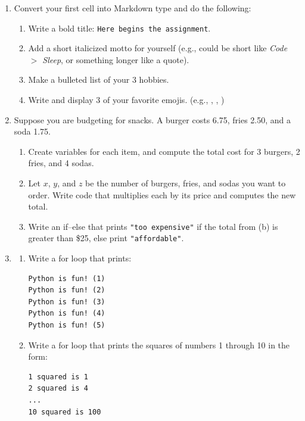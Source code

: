 \documentclass[12pt]{article}
\begin{document}
\begin{enumerate}[leftmargin=1.2em, label=\textbf{\arabic*.}]

  \item
  Convert your first cell into Markdown type and do the following:
  \begin{enumerate}
    \item Write a bold title: \texttt{Here begins the assignment}. \vspace{1.5cm}
    \item Add a short italicized motto for yourself (e.g., could be short like \textit{Code $>$ Sleep}, or something longer like a quote). \vspace{1.5cm}
    \item Make a bulleted list of your 3 hobbies. \vspace{2cm}
    \item Write and display 3 of your favorite emojis. (e.g., , , )\vspace{1.5cm}
  \end{enumerate}

\item Suppose you are budgeting for snacks. A burger costs 6.75, fries 2.50, and a soda 1.75. 
\begin{enumerate}
  \item Create variables for each item, and compute the total cost for 3 burgers, 2 fries, and 4 sodas. \vspace{2.5cm}
  \item Let $x$, $y$, and $z$ be the number of burgers, fries, and sodas you want to order. Write code that multiplies each by its price and computes the new total. \vspace{2cm}
  \item Write an if--else that prints \texttt{"too expensive"} if the total from (b) is greater than \$25, else print \texttt{"affordable"}. \vspace{2cm}
\end{enumerate}



  \item
  \begin{enumerate}
    \item Write a for loop that prints:  
\begin{verbatim}
Python is fun! (1)
Python is fun! (2)
Python is fun! (3)
Python is fun! (4)
Python is fun! (5)
\end{verbatim}
    \vspace{2cm}
    \item Write a for loop that prints the squares of numbers 1 through 10 in the form:  
\begin{verbatim}
1 squared is 1
2 squared is 4
...
10 squared is 100
\end{verbatim}
    \vspace{1cm}
  \end{enumerate}


\end{enumerate}
\end{document}
